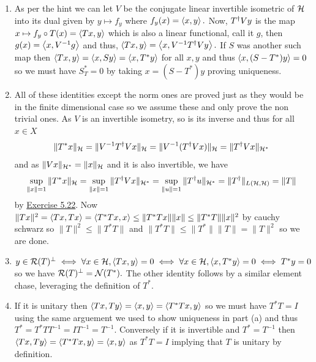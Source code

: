\documentclass[12pt,a4paper]{article}
\begin{document}
\begin{solution}
    \begin{enumerate}[label=\alph*.]
        \item As per the hint we can let $V$ be the conjugate linear invertible isometric of $\mathcal{H}$ into its dual given by $y\mapsto f_y$ where $f_y(x)=\left\langle x,y\right\rangle.$ 
            Now, $T^\dagger Vy$ is the map $x\mapsto f_y\circ T(x)=\left\langle Tx,y\right\rangle$ which is also a linear functional, call it $g$, then $g(x)=\left\langle x,V^{-1}g\right\rangle$ and thus, $\left\langle Tx,y\right\rangle=\left\langle x,V^{-1}T^\dagger Vy\right\rangle.$ 
            If $S$ was another such map then $\left\langle Tx,y\right\rangle=\left\langle x,Sy\right\rangle=\left\langle x,T^*y\right\rangle$ for all $x,y$ and thus $\left\langle x,(S-T^*)y\right\rangle=0$ so we must have $S_T^*=0$ by taking $x=(S-T^*)y$ proving uniqueness. 
        \item All of these identities except the norm ones are proved just as they would be in the finite dimensional case so we assume these and only prove the non trivial ones. 
            As $V$ is an invertible isometry, so is its inverse and thus for all $x\in X$
            \[
                \|T^*x\|_{\mathcal{H}}=\|V^{-1}T^\dagger Vx\|_{\mathcal{H}}=\|V^{-1}(T^\dagger Vx)\|_{\mathcal{H}}=\|T^\dagger Vx\|_{\mathcal{H}^*}
            \] 
            and as $\|Vx\|_{\mathcal{H}^*}=\|x\|_{\mathcal{H}}$ and it is also invertible, we have 
            \[
                \sup_{\|x\|=1}\|T^*x\|_{\mathcal{H}}=\sup_{\|x\|=1}\|T^\dagger Vx\|_{\mathcal{H}^*}=\sup_{\|u\|=1}\|T^\dagger u\|_{\mathcal{H}^*}=\|T^\dagger\|_{L(\mathcal{H},\mathcal{H})}=\|T\|
            \]
            by \hyperref[prob:5-22]{Exercise 5.22}. 
            Now $\|Tx\|^2=\left\langle Tx,Tx\right\rangle=\left\langle T^*Tx,x\right\rangle\leq\|T^*Tx\|\|x\|\leq\|T^*T\|\|x\|^2$ by cauchy schwarz so $\|T\|^2\leq\|T^*T\|$ and $\|T^*T\|\leq\|T^*\|\|T\|=\|T\|^2$ so we are done. 
        \item $y\in\mathcal{R}(T)^\perp\iff\forall x\in\mathcal{H},\left\langle Tx,y\right\rangle=0\iff\forall x\in\mathcal{H},\left\langle x,T^*y\right\rangle=0\iff T^*y=0$ so we have $\mathcal{R}(T)^\perp=\mathcal{N}(T^*).$ 
            The other identity follows by a similar element chase, leveraging the definition of $T^*.$ 
        \item If it is unitary then $\left\langle Tx,Ty\right\rangle=\left\langle x,y\right\rangle=\left\langle T^*Tx,y\right\rangle$ so we must have $T^*T=I$ using the same arguement we used to show uniqueness in part (a) and thus $T^*=T^*TT^{-1}=IT^{-1}=T^{-1}$. 
        Conversely if it is invertible and $T^*=T^{-1}$ then $\left\langle Tx,Ty\right\rangle=\left\langle T^*Tx,y\right\rangle=\left\langle x,y\right\rangle$ as $T^*T=I$ implying that $T$ is unitary by definition. 
    \end{enumerate}
\end{solution}
\end{document}
